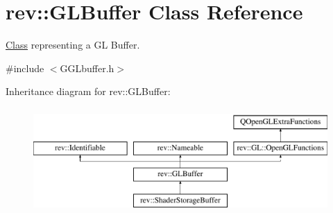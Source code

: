 \hypertarget{classrev_1_1_g_l_buffer}{}\section{rev\+::G\+L\+Buffer Class Reference}
\label{classrev_1_1_g_l_buffer}


\mbox{\hyperlink{struct_class}{Class}} representing a GL Buffer.  




{\ttfamily \#include $<$G\+G\+Lbuffer.\+h$>$}

Inheritance diagram for rev\+::G\+L\+Buffer\+:\begin{figure}[H]
\begin{center}
\leavevmode
\includegraphics[height=4.000000cm]{classrev_1_1_g_l_buffer}
\end{center}
\end{figure}
